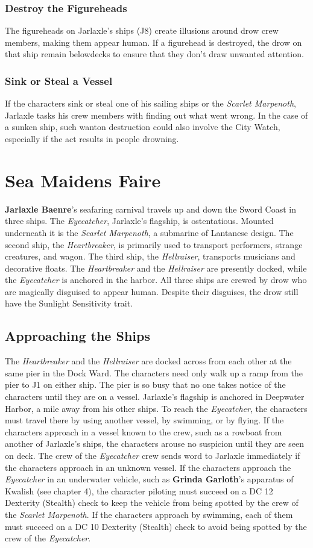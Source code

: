 \documentclass[10pt,a4paper,twoside,twocolumn,openany,nodeprecatedcode]{dndbook}
\begin{document}
\subsubsection{Destroy the Figureheads}
The figureheads on Jarlaxle's ships (J8) create illusions around drow crew members, making them appear human. If a figurehead is destroyed, the drow on that ship remain belowdecks to ensure that they don't draw unwanted attention.
\subsubsection{Sink or Steal a Vessel}
If the characters sink or steal one of his sailing ships or the \textit{Scarlet Marpenoth}, Jarlaxle tasks his crew members with finding out what went wrong. In the case of a sunken ship, such wanton destruction could also involve the City Watch, especially if the act results in people drowning.
\section{Sea Maidens Faire}
\textbf{Jarlaxle Baenre}'s seafaring carnival travels up and down the Sword Coast in three ships. The \textit{Eyecatcher}, Jarlaxle's flagship, is ostentatious. Mounted underneath it is the \textit{Scarlet Marpenoth}, a submarine of Lantanese design. The second ship, the \textit{Heartbreaker}, is primarily used to transport performers, strange creatures, and wagon. The third ship, the \textit{Hellraiser}, transports musicians and decorative floats. The \textit{Heartbreaker} and the \textit{Hellraiser} are presently docked, while the \textit{Eyecatcher} is anchored in the harbor.
All three ships are crewed by drow who are magically disguised to appear human. Despite their disguises, the drow still have the Sunlight Sensitivity trait.
\subsection{Approaching the Ships}
The \textit{Heartbreaker} and the \textit{Hellraiser} are docked across from each other at the same pier in the Dock Ward. The characters need only walk up a ramp from the pier to J1 on either ship. The pier is so busy that no one takes notice of the characters until they are on a vessel.
Jarlaxle's flagship is anchored in Deepwater Harbor, a mile away from his other ships. To reach the \textit{Eyecatcher}, the characters must travel there by using another vessel, by swimming, or by flying. If the characters approach in a vessel known to the crew, such as a rowboat from another of Jarlaxle's ships, the characters arouse no suspicion until they are seen on deck. The crew of the \textit{Eyecatcher} crew sends word to Jarlaxle immediately if the characters approach in an unknown vessel.
If the characters approach the \textit{Eyecatcher} in an underwater vehicle, such as \textbf{Grinda Garloth}'s apparatus of Kwalish (see chapter 4), the character piloting must succeed on a DC 12 Dexterity (Stealth) check to keep the vehicle from being spotted by the crew of the \textit{Scarlet Marpenoth}. If the characters approach by swimming, each of them must succeed on a DC 10 Dexterity (Stealth) check to avoid being spotted by the crew of the \textit{Eyecatcher}.
\end{document}
